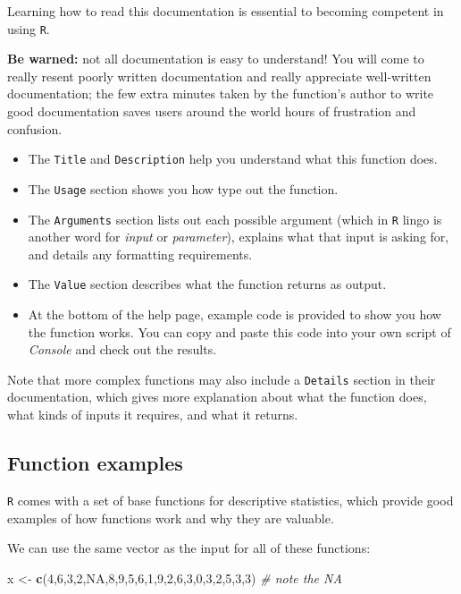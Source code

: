 \documentclass[
]{book}
\newenvironment{Shaded}{\begin{snugshade}}{\end{snugshade}}
\newcommand{\CommentTok}[1]{\textcolor[rgb]{0.56,0.35,0.01}{\textit{#1}}}
\newcommand{\DecValTok}[1]{\textcolor[rgb]{0.00,0.00,0.81}{#1}}
\newcommand{\KeywordTok}[1]{\textcolor[rgb]{0.13,0.29,0.53}{\textbf{#1}}}
\newcommand{\NormalTok}[1]{#1}
\newcommand{\OtherTok}[1]{\textcolor[rgb]{0.56,0.35,0.01}{#1}}
\newcommand{\StringTok}[1]{\textcolor[rgb]{0.31,0.60,0.02}{#1}}
\begin{document}
Learning how to read this documentation is essential to becoming competent in using \texttt{R}.

\textbf{Be warned:} not all documentation is easy to understand! You will come to really resent poorly written documentation and really appreciate well-written documentation; the few extra minutes taken by the function's author to write good documentation saves users around the world hours of frustration and confusion.

\begin{itemize}
\item
  The \texttt{Title} and \texttt{Description} help you understand what this function does.
\item
  The \texttt{Usage} section shows you how type out the function.
\item
  The \texttt{Arguments} section lists out each possible argument (which in \texttt{R} lingo is another word for \emph{input} or \emph{parameter}), explains what that input is asking for, and details any formatting requirements.
\item
  The \texttt{Value} section describes what the function returns as output.
\item
  At the bottom of the help page, example code is provided to show you how the function works. You can copy and paste this code into your own script of \emph{Console} and check out the results.
\end{itemize}

Note that more complex functions may also include a \texttt{Details} section in their documentation, which gives more explanation about what the function does, what kinds of inputs it requires, and what it returns.

\hypertarget{function-examples}{%
\subsection*{Function examples}\label{function-examples}}

\texttt{R} comes with a set of base functions for descriptive statistics, which provide good examples of how functions work and why they are valuable.

We can use the same vector as the input for all of these functions:

\begin{Shaded}
\begin{Highlighting}[]
\NormalTok{x <-}\StringTok{ }\KeywordTok{c}\NormalTok{(}\DecValTok{4}\NormalTok{,}\DecValTok{6}\NormalTok{,}\DecValTok{3}\NormalTok{,}\DecValTok{2}\NormalTok{,}\OtherTok{NA}\NormalTok{,}\DecValTok{8}\NormalTok{,}\DecValTok{9}\NormalTok{,}\DecValTok{5}\NormalTok{,}\DecValTok{6}\NormalTok{,}\DecValTok{1}\NormalTok{,}\DecValTok{9}\NormalTok{,}\DecValTok{2}\NormalTok{,}\DecValTok{6}\NormalTok{,}\DecValTok{3}\NormalTok{,}\DecValTok{0}\NormalTok{,}\DecValTok{3}\NormalTok{,}\DecValTok{2}\NormalTok{,}\DecValTok{5}\NormalTok{,}\DecValTok{3}\NormalTok{,}\DecValTok{3}\NormalTok{)  }\CommentTok{# note the NA}
\end{Highlighting}
\end{Shaded}
\end{document}
